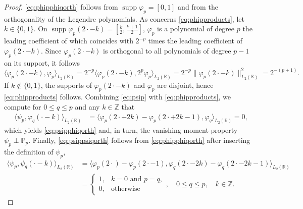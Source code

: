 \documentclass{article}
\DeclareMathOperator{\supp}{supp}
\begin{document}
\begin{proof}
  \eqref{eq:phipphiqorth} follows from $\supp\varphi_p=[0,1]$ and from the orthogonality of the Legendre polynomials. As concerns \eqref{eq:phipproducts}, let $k\in\{0,1\}$. On $\supp\varphi_p(2\cdot-k)=[\frac{k}{2},\frac{k+1}{2}]$,
  $\varphi_p$ is a polynomial of degree $p$ the leading
  coefficient of which coincides with $2^{-p}$ times the leading coefficient of $\varphi_p(2\cdot-k)$.
  Since $\varphi_p(2\cdot-k)$ is orthogonal to all polynomials of degree $p-1$ on its support,
  it follows
  \begin{equation*}
    \big\langle\varphi_p(2\cdot-k),\varphi_p\big\rangle_{L_2(\mathbb R)}
    =
    2^{-p}\big\langle\varphi_p(2\cdot-k),2^p\varphi_p\big\rangle_{L_2(\mathbb R)}
    =
    2^{-p}\big\|\varphi_p(2\cdot-k)\|_{L_2(\mathbb R)}^2
    =
    2^{-(p+1)}.
  \end{equation*}
  If $k\notin\{0,1\}$, the supports of $\varphi_p(2\cdot-k)$ and $\varphi_p$
  are disjoint, hence \eqref{eq:phipproducts} follows.
  Combining \eqref{eq:psip} with \eqref{eq:phipproducts},
  we compute for $0\le q\le p$ and any $k\in\mathbb Z$ that
  \begin{align*}
    \big\langle\psi_p,\varphi_q(\cdot-k)\big\rangle_{L_2(\mathbb R)}
    &=
    \big\langle\varphi_p(2\cdot+2k)-\varphi_p(2\cdot+2k-1),\varphi_q\big\rangle_{L_2(\mathbb R)}
    =0,
  \end{align*}
  which yields \eqref{eq:psipphiqorth} and, in turn, the vanishing moment property
  $\psi_p\perp\mathbb P_p$. Finally, \eqref{eq:psippsiqorth} follows from \eqref{eq:phipphiqorth} after inserting the definition of $\psi_p$,
  \begin{align*}
  \big\langle\psi_p,\psi_q(\cdot-k)\big\rangle_{L_2(\mathbb R)}
  &=
  \big\langle\varphi_p(2\cdot)-\varphi_p(2\cdot-1),\varphi_q(2\cdot-2k)-\varphi_q(2\cdot-2k-1)\big\rangle_{L_2(\mathbb R)}\\
  &=
  \begin{cases}
  1,&k=0\text{ and }p=q,\\
  0,&\text{otherwise}
  \end{cases},\quad 0\le q\le p,\quad k\in\mathbb Z.
  \end{align*}
\end{proof}
\end{document}
